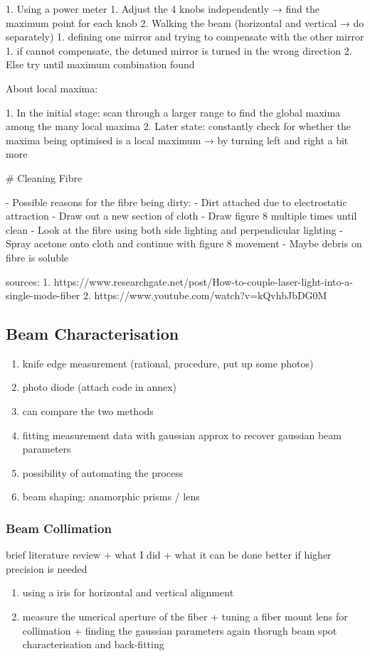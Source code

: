 \documentclass[11pt,A4Paper]{article}
\begin{document}
1. Using a power meter 
    1. Adjust the 4 knobs independently → find the maximum point for each knob
    2. Walking the beam (horizontal and vertical → do separately)
        1. defining one mirror and trying to compensate with the other mirror 
            1. if cannot compensate, the detuned mirror is turned in the wrong direction
            2. Else try until maximum combination found

About local maxima: 

1. In the initial stage: scan through a larger range to find the global maxima among the many local maxima 
2. Later state: constantly check for whether the maxima being optimised is a local maximum → by turning left and right a bit more

# Cleaning Fibre

- Possible reasons for the fibre being dirty:
    - Dirt attached due to electrostatic attraction
- Draw out a new section of cloth
- Draw figure 8 multiple times until clean
- Look at the fibre using both side lighting and perpendicular lighting
- Spray acetone onto cloth and continue with figure 8 movement
    - Maybe debris on fibre is soluble

sources: 
1. https://www.researchgate.net/post/How-to-couple-laser-light-into-a-single-mode-fiber
2. https://www.youtube.com/watch?v=kQvhbJbDG0M


\subsection{Beam Characterisation}
\begin{enumerate}
    \item knife edge measurement (rational, procedure, put up some photos)
    \item photo diode (attach code in annex)
    \item can compare the two methods
    \item fitting measurement data with gaussian approx to recover gaussian beam parameters 
    \item possibility of automating the process
    \item beam shaping: anamorphic prisms / lens
\end{enumerate}

\subsubsection{Beam Collimation}
brief literature review + what I did + what it can be done better if higher precision is needed
\begin{enumerate}
    \item using a iris for horizontal and vertical alignment
    \item measure the umerical aperture of the fiber + tuning a fiber mount lens for collimation + finding the gaussian parameters again thorugh beam spot characterisation and back-fitting
\end{enumerate}
\end{document}
